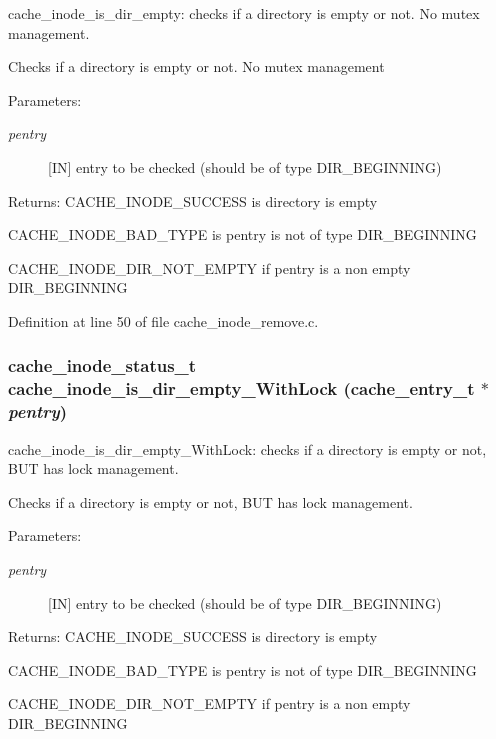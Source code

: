 cache\_\-inode\_\-is\_\-dir\_\-empty: checks if a directory is empty or not. No mutex management.

Checks if a directory is empty or not. No mutex management

\begin{Desc}
\item[Parameters:]
\begin{description}
\item[{\em pentry}][IN] entry to be checked (should be of type DIR\_\-BEGINNING)\end{description}
\end{Desc}
\begin{Desc}
\item[Returns:]CACHE\_\-INODE\_\-SUCCESS is directory is empty\par
 

CACHE\_\-INODE\_\-BAD\_\-TYPE is pentry is not of type DIR\_\-BEGINNING\par
 

CACHE\_\-INODE\_\-DIR\_\-NOT\_\-EMPTY if pentry is a non empty DIR\_\-BEGINNING \end{Desc}


Definition at line 50 of file cache\_\-inode\_\-remove.c.
\subsubsection[{cache\_\-inode\_\-is\_\-dir\_\-empty\_\-WithLock}]{\setlength{\rightskip}{0pt plus 5cm}cache\_\-inode\_\-status\_\-t cache\_\-inode\_\-is\_\-dir\_\-empty\_\-WithLock (cache\_\-entry\_\-t $\ast$ {\em pentry})}\label{cache__inode__remove_8c_ae2de7c7798f173e1a0ff9bb79746fad}


cache\_\-inode\_\-is\_\-dir\_\-empty\_\-WithLock: checks if a directory is empty or not, BUT has lock management.

Checks if a directory is empty or not, BUT has lock management.

\begin{Desc}
\item[Parameters:]
\begin{description}
\item[{\em pentry}][IN] entry to be checked (should be of type DIR\_\-BEGINNING)\end{description}
\end{Desc}
\begin{Desc}
\item[Returns:]CACHE\_\-INODE\_\-SUCCESS is directory is empty\par
 

CACHE\_\-INODE\_\-BAD\_\-TYPE is pentry is not of type DIR\_\-BEGINNING\par
 

CACHE\_\-INODE\_\-DIR\_\-NOT\_\-EMPTY if pentry is a non empty DIR\_\-BEGINNING \end{Desc}


